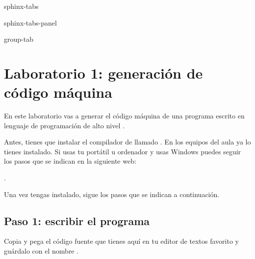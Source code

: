 \documentclass[letterpaper,10pt,spanish]{sphinxmanual}
\begin{document}
\begin{sphinxuseclass}{sphinx-tabs}
\begin{sphinxuseclass}{sphinx-tabs-panel}
\begin{sphinxuseclass}{group-tab}
\end{sphinxuseclass}
\end{sphinxuseclass}
\end{sphinxuseclass}
\sphinxstepscope


\chapter{Laboratorio 1: generación de código máquina}
\label{\detokenize{lab1:laboratorio-1-generacion-de-codigo-maquina}}\label{\detokenize{lab1::doc}}
\sphinxAtStartPar
En este laboratorio vas a generar el código máquina de una programa escrito en lenguaje de programación de alto nivel .

\sphinxAtStartPar
Antes, tienes que instalar el compilador de  llamado . En los equipos del aula ya lo tienes instalado. Si usas tu portátil u ordenador y usas Windows puedes seguir los pasos que se indican en la siguiente web: %
\begin{footnote}[2]\sphinxAtStartFootnote
{}
%
\end{footnote}.

\sphinxAtStartPar
Una vez tengas  instalado, sigue los pasos que se indican a continuación.


\section{Paso 1: escribir el programa}
\label{\detokenize{lab1:paso-1-escribir-el-programa}}
\sphinxAtStartPar
Copia y pega el código fuente que tienes aquí en tu editor de textos favorito y guárdalo con el nombre .
\end{document}
